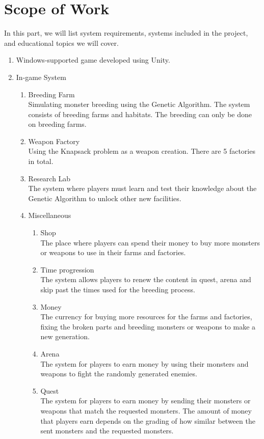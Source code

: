 \documentclass[12pt,oneside,openright,a4paper]{cpe-english-project}
\begin{document}
\section{Scope of Work}
In this part, we will list system requirements, systems included in the project, and educational topics we will cover.
\begin{enumerate}
	\item Windows-supported game developed using Unity.
	\item In-game System
	\begin{enumerate}
		\item Breeding Farm \\
		Simulating monster breeding using the Genetic Algorithm. The system consists of breeding farms and habitats. The breeding can only be done on breeding farms.
		\item Weapon Factory \\
		Using the Knapsack problem as a weapon creation. There are 5 factories in total.
		\item Research Lab \\
		The system where players must learn and test their knowledge about the Genetic Algorithm to unlock other new facilities.
		\item Miscellaneous
		\begin{enumerate}
			\item Shop \\
			The place where players can spend their money to buy more monsters or weapons to use in their farms and factories.
			\item Time progression \\
			The system allows players to renew the content in quest, arena and skip past the times used for the breeding process.
			\item Money  \\
			The currency for buying more resources for the farms and factories, fixing the broken parts and breeding monsters or weapons to make a new generation.
			\item Arena \\
			The system for players to earn money by using their monsters and weapons to fight the randomly generated enemies.
			\item Quest \\
			The system for players to earn money by sending their monsters or weapons that match the requested monsters. The amount of money that players earn depends on the grading of how similar between the sent monsters and the requested monsters.

\end{enumerate}
\end{enumerate}
\end{enumerate}
\end{document}
